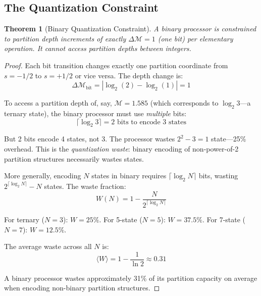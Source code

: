 \documentclass[twocolumn,10pt]{article}
\newtheorem{theorem}{Theorem}[section]
\theoremstyle{remark}
\newcommand{\Depth}{\mathcal{M}}
\begin{document}
\subsection{The Quantization Constraint}

\begin{theorem}[Binary Quantization Constraint]
\label{thm:quantization}
A binary processor is constrained to partition depth increments of exactly $\Delta\Depth = 1$ (one bit) per elementary operation. It cannot access partition depths between integers.
\end{theorem}

\begin{proof}
Each bit transition changes exactly one partition coordinate from $s = -1/2$ to $s = +1/2$ or vice versa. The depth change is:
\begin{equation}
    \Delta\Depth_{\text{bit}} = |\log_2(2) - \log_2(1)| = 1
\end{equation}

To access a partition depth of, say, $\Depth = 1.585$ (which corresponds to $\log_2 3$---a ternary state), the binary processor must use \emph{multiple} bits:
\begin{equation}
    \lceil \log_2 3 \rceil = 2 \text{ bits to encode 3 states}
\end{equation}

But 2 bits encode 4 states, not 3. The processor wastes $2^2 - 3 = 1$ state---25\% overhead. This is the \emph{quantization waste}: binary encoding of non-power-of-2 partition structures necessarily wastes states.

More generally, encoding $N$ states in binary requires $\lceil \log_2 N \rceil$ bits, wasting $2^{\lceil \log_2 N \rceil} - N$ states. The waste fraction:
\begin{equation}
    W(N) = 1 - \frac{N}{2^{\lceil \log_2 N \rceil}}
\end{equation}

For ternary ($N = 3$): $W = 25\%$. For 5-state ($N = 5$): $W = 37.5\%$. For 7-state ($N = 7$): $W = 12.5\%$.

The average waste across all $N$ is:
\begin{equation}
    \langle W \rangle = 1 - \frac{1}{\ln 2} \approx 0.31
\end{equation}

A binary processor wastes approximately 31\% of its partition capacity on average when encoding non-binary partition structures.
\end{proof}
\end{document}
